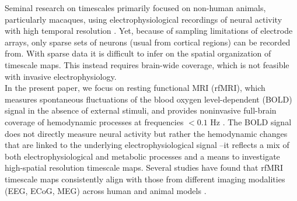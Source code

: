 \documentclass[latex/main.tex]{subfiles}
\begin{document}
Seminal research on timescales primarily focused on non-human animals, particularly macaques, using electrophysiological recordings of neural activity with high temporal resolution \cite{murray_hierarchy_2014, cirillo_neural_2018, nougaret_intrinsic_2021, manea_intrinsic_2022}. Yet, because of sampling limitations of electrode arrays, only sparse sets of neurons (usual from cortical regions) can be recorded from. With sparse data it is difficult to infer on the spatial organization of timescale maps. This instead requires brain-wide coverage, which is not feasible with invasive electrophysiology.\\

In the present paper, we focus on resting functional MRI (rfMRI), which measures spontaneous fluctuations of the blood oxygen level-dependent (BOLD) signal in the absence of external stimuli, and provides noninvasive full-brain coverage of hemodynamic processes at frequencies $<0.1$ Hz \cite{raut_hierarchical_2020, he_scale-free_2011}. The BOLD signal does not directly measure neural activity but rather the hemodynamic changes that are linked to the underlying electrophysiological signal \cite{logothetis_what_2008}--it reflects a mix of both electrophysiological and metabolic processes and a means to investigate high-spatial resolution timescale maps. Several studies have found that rfMRI timescale maps consistently align with those from different imaging modalities (EEG, ECoG, MEG) across human and animal models \cite{raut_hierarchical_2020, shafiei_topographic_2020, lurie_cortical_2024, mitra_lag_2014, kaneoke_variance_2012, wengler_distinct_2020, shinn_functional_2023, manea_intrinsic_2022, ito_cortical_2020, muller_core_2020}.\\
\end{document}
